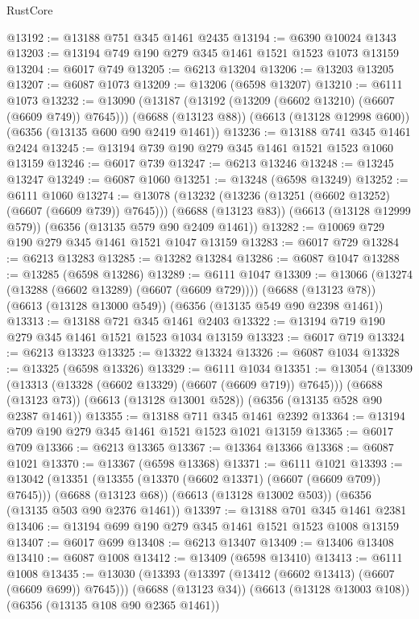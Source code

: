 \begin{lexlean}{RustCore}
\begin{coremodule}
@13192 := @13188 @751 @345 @1461 @2435
@13194 := @6390 @10024 @1343
@13203 := @13194 @749 @190 @279 @345 @1461 @1521 @1523 @1073 @13159
@13204 := @6017 @749
@13205 := @6213 @13204
@13206 := @13203 @13205
@13207 := @6087 @1073
@13209 := @13206 (@6598 @13207)
@13210 := @6111 @1073
@13232 := @13090
    (@13187 (@13192 (@13209 (@6602 @13210) (@6607 (@6609 @749)) @7645)))
    (@6688 (@13123 @88))
    (@6613 (@13128 @12998 @600))
    (@6356 (@13135 @600 @90 @2419 @1461))
@13236 := @13188 @741 @345 @1461 @2424
@13245 := @13194 @739 @190 @279 @345 @1461 @1521 @1523 @1060 @13159
@13246 := @6017 @739
@13247 := @6213 @13246
@13248 := @13245 @13247
@13249 := @6087 @1060
@13251 := @13248 (@6598 @13249)
@13252 := @6111 @1060
@13274 := @13078
    (@13232 (@13236 (@13251 (@6602 @13252) (@6607 (@6609 @739)) @7645)))
    (@6688 (@13123 @83))
    (@6613 (@13128 @12999 @579))
    (@6356 (@13135 @579 @90 @2409 @1461))
@13282 := @10069 @729 @190 @279 @345 @1461 @1521 @1047 @13159
@13283 := @6017 @729
@13284 := @6213 @13283
@13285 := @13282 @13284
@13286 := @6087 @1047
@13288 := @13285 (@6598 @13286)
@13289 := @6111 @1047
@13309 := @13066
    (@13274 (@13288 (@6602 @13289) (@6607 (@6609 @729))))
    (@6688 (@13123 @78))
    (@6613 (@13128 @13000 @549))
    (@6356 (@13135 @549 @90 @2398 @1461))
@13313 := @13188 @721 @345 @1461 @2403
@13322 := @13194 @719 @190 @279 @345 @1461 @1521 @1523 @1034 @13159
@13323 := @6017 @719
@13324 := @6213 @13323
@13325 := @13322 @13324
@13326 := @6087 @1034
@13328 := @13325 (@6598 @13326)
@13329 := @6111 @1034
@13351 := @13054
    (@13309 (@13313 (@13328 (@6602 @13329) (@6607 (@6609 @719)) @7645)))
    (@6688 (@13123 @73))
    (@6613 (@13128 @13001 @528))
    (@6356 (@13135 @528 @90 @2387 @1461))
@13355 := @13188 @711 @345 @1461 @2392
@13364 := @13194 @709 @190 @279 @345 @1461 @1521 @1523 @1021 @13159
@13365 := @6017 @709
@13366 := @6213 @13365
@13367 := @13364 @13366
@13368 := @6087 @1021
@13370 := @13367 (@6598 @13368)
@13371 := @6111 @1021
@13393 := @13042
    (@13351 (@13355 (@13370 (@6602 @13371) (@6607 (@6609 @709)) @7645)))
    (@6688 (@13123 @68))
    (@6613 (@13128 @13002 @503))
    (@6356 (@13135 @503 @90 @2376 @1461))
@13397 := @13188 @701 @345 @1461 @2381
@13406 := @13194 @699 @190 @279 @345 @1461 @1521 @1523 @1008 @13159
@13407 := @6017 @699
@13408 := @6213 @13407
@13409 := @13406 @13408
@13410 := @6087 @1008
@13412 := @13409 (@6598 @13410)
@13413 := @6111 @1008
@13435 := @13030
    (@13393 (@13397 (@13412 (@6602 @13413) (@6607 (@6609 @699)) @7645)))
    (@6688 (@13123 @34))
    (@6613 (@13128 @13003 @108))
    (@6356 (@13135 @108 @90 @2365 @1461))

\end{coremodule}
\end{lexlean}
